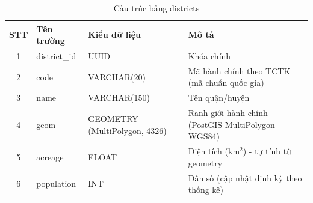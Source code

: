 \renewcommand{\arraystretch}{1.3}
\begin{longtable}{|c|p{3.5cm}|p{4.5cm}|p{5.5cm}|}
    \caption{Cấu trúc bảng districts}
    \label{tab:db_districts} \\

    \hline
    \textbf{STT} & \textbf{Tên trường} & \textbf{Kiểu dữ liệu} & \textbf{Mô tả} \\ \hline
    \endfirsthead

    \hline
    \endhead
    \hline
    \endfoot
    \hline
    \endlastfoot

    1 & district\_id & UUID & Khóa chính \\ \hline
    2 & code & VARCHAR(20) & Mã hành chính theo TCTK (mã chuẩn quốc gia) \\ \hline
    3 & name & VARCHAR(150) & Tên quận/huyện \\ \hline
    4 & geom & GEOMETRY (MultiPolygon, 4326) & Ranh giới hành chính (PostGIS MultiPolygon WGS84) \\ \hline
    5 & acreage & FLOAT & Diện tích (km$^2$) - tự tính từ geometry \\ \hline
    6 & population & INT & Dân số (cập nhật định kỳ theo thống kê) \\
\end{longtable}